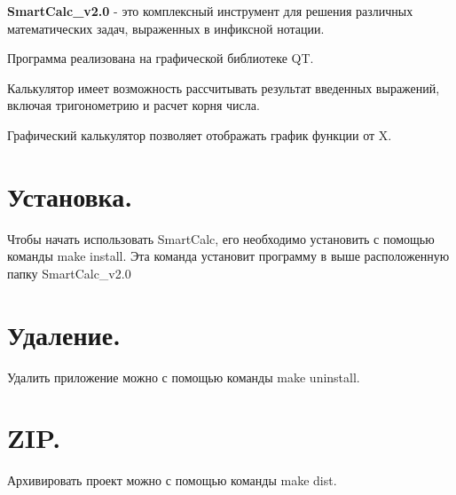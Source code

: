 \documentclass{report}
\begin{document}
{\bfseries SmartCalc\_v2.0} - это комплексный инструмент для решения различных математических задач, выраженных в инфиксной нотации.

Программа реализована на графической библиотеке QT.

Калькулятор имеет возможность рассчитывать результат введенных выражений, включая тригонометрию и расчет корня числа.

Графический калькулятор позволяет отображать график функции от X.

\section* {\bfseries Установка.}

Чтобы начать использовать SmartCalc, его необходимо установить с помощью команды make install. Эта команда установит программу в выше расположенную папку SmartCalc\_v2.0

\section* {\bfseries Удаление.}

Удалить приложение можно с помощью команды make uninstall.

\section* {\bfseries ZIP.}

Архивировать проект можно с помощью команды make dist.
\end{document}
